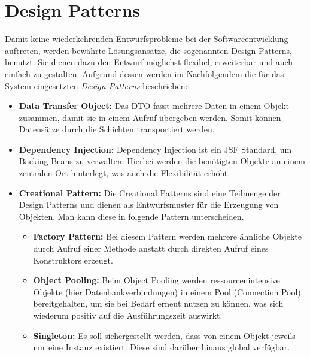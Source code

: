 \section{Design Patterns}
Damit keine wiederkehrenden Entwurfsprobleme bei der Softwareentwicklung auftreten, werden bewährte Lösungsansätze, die sogenannten \glqq Design Patterns\grqq{}, benutzt. Sie dienen dazu den Entwurf möglichst flexibel, erweiterbar und auch einfach zu gestalten. Aufgrund dessen werden im Nachfolgendem die für das System eingesetzten \textit{Design Patterns} beschrieben:
	\begin{itemize}
		\item \textbf{Data Transfer Object:} Das DTO fasst mehrere Daten in einem Objekt zusammen, damit sie in einem Aufruf übergeben werden. Somit können Datensätze durch die Schichten transportiert werden.
		\item \textbf{Dependency Injection:} Dependency Injection ist ein JSF Standard, um Backing Beans zu verwalten. Hierbei werden die benötigten Objekte an einem zentralen Ort hinterlegt, was auch die Flexibilität erhöht.  
		\item \textbf{Creational Pattern:} Die Creational Patterns sind eine Teilmenge der Design Patterns und dienen als Entwurfsmuster für die Erzeugung von Objekten. Man kann diese in folgende Pattern unterscheiden.
			\begin{itemize}
				\item \textbf{Factory Pattern:} Bei diesem Pattern werden mehrere ähnliche Objekte durch Aufruf einer Methode anstatt durch direkten Aufruf eines Konstruktors erzeugt.
				\item \textbf{Object Pooling:} Beim Object Pooling werden ressourcenintensive Objekte (hier Datenbankverbindungen) in einem Pool (Connection Pool) bereitgehalten, um sie bei Bedarf erneut nutzen zu können, was sich wiederum positiv auf die Ausführungszeit auswirkt.
				\item \textbf{Singleton:} Es soll sichergestellt werden, dass von einem Objekt jeweils nur eine Instanz existiert. Diese sind darüber hinaus global verfügbar.  
			\end{itemize}
	\end{itemize}

